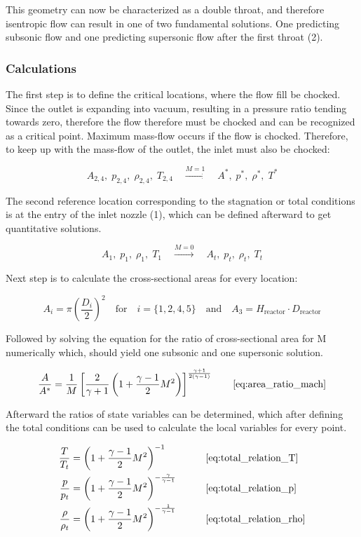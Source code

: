 This geometry can now be characterized as a double throat, and therefore isentropic flow can result in one of two fundamental solutions.
One predicting subsonic flow and one predicting supersonic flow after the first throat (2).
\cite{SALAS1986193}
\cite{EMMONS1958}

\subsubsection*{Calculations}
The first step is to define the critical locations, where the flow fill be chocked.
Since the outlet is expanding into vacuum, resulting in a pressure ratio tending towards zero, therefore the flow therefore must be chocked and can be recognized as a critical point.
Maximum mass-flow occurs if the flow is chocked. Therefore, to keep up with the mass-flow of the outlet, the inlet must also be chocked: 

$$
	A_{2,4},\;p_{2,4},\;\rho_{2,4},\;T_{2,4}\quad\xrightarrow{M=1}\quad A^*,\;p^*,\;\rho^*,\;T^*
$$

The second reference location corresponding to the stagnation or total conditions is at the entry of the inlet nozzle (1), which can be defined afterward to get quantitative solutions.

$$
	A_1,\;p_1,\;\rho_1,\;T_1\quad\xrightarrow{M=0}\quad A_t,\;p_t,\;\rho_t,\;T_t
$$

Next step is to calculate the cross-sectional areas for every location:

$$
	A_i = \pi \left(\frac{D_i}{2}\right)^2
		\quad \text{for} \quad
	i=\{1,2,4,5\}
		\quad \text{and} \quad
	A_3 = H_\text{reactor}\cdot D_\text{reactor}
$$

Followed by solving the equation for the ratio of cross-sectional area for M numerically which, should yield one subsonic and one supersonic solution.

$$
	\frac{A}{A^*} = \frac{1}{M} \left[ \frac{2}{\gamma + 1} \left( 1 + \frac{\gamma - 1}{2} M^2 \right) \right]^{\frac{\gamma + 1}{2(\gamma - 1)}}
	\qquad \eqref{eq:area_ratio_mach}
$$

Afterward the ratios of state variables can be determined, which after defining the total conditions can be used to calculate the local variables for every point.
\cite{hall_isentropic_nodate}

\begin{alignat*}{2}
    \frac{T}{T_t}   & = \left( 1 + \frac{\gamma - 1}{2} M^2 \right)^{-1}
    & \qquad & \eqref{eq:total_relation_T} \\
    \frac{p}{p_t}   & = \left( 1 + \frac{\gamma - 1}{2} M^2 \right)^{-\frac{\gamma}{\gamma - 1}}
    & \qquad & \eqref{eq:total_relation_p} \\
    \frac{\rho}{\rho_t} & = \left( 1 + \frac{\gamma - 1}{2} M^2 \right)^{-\frac{1}{\gamma - 1}}
    & \qquad & \eqref{eq:total_relation_rho}
\end{alignat*}

